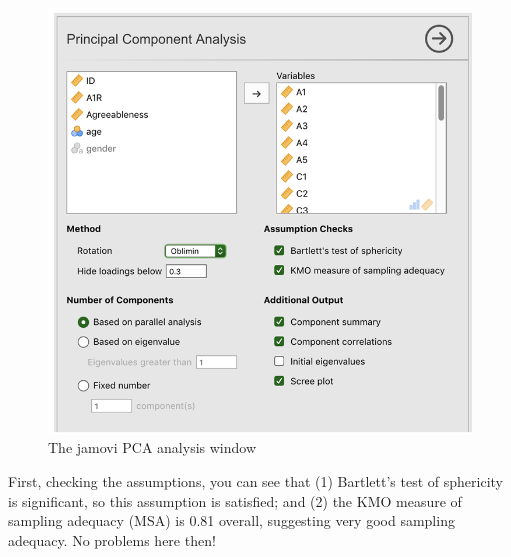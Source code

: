 \documentclass[
]{book}
\begin{document}
\begin{figure}

{\centering \includegraphics[width=1\linewidth]{img/factoranalysis/pca1} 

}

\caption{The jamovi PCA analysis window}\label{fig:pca1}
\end{figure}

First, checking the assumptions, you can see that (1) Bartlett's test of sphericity is significant, so this assumption is satisfied; and (2) the KMO measure of sampling adequacy (MSA) is 0.81 overall, suggesting very good sampling adequacy. No problems here then!
\end{document}
